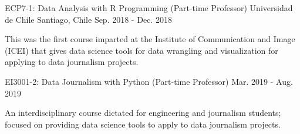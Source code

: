 \begin{cventries}
  \cventrytwopositions
    {ECP7-1: Data Analysis with R Programming (Part-time Professor)}
    {Universidad de Chile}
    {Santiago, Chile}
    {Sep. 2018 - Dec. 2018}
    {
      \begin{cvitems}
        \item {This was the first course imparted at the Institute of Communication and Image (ICEI) that gives data science tools for data wrangling and visualization for applying to data journalism projects.}      
      \end{cvitems}
    }
    {EI3001-2: Data Journalism with Python (Part-time Professor)}
    {Mar. 2019 - Aug. 2019}
    {
      \begin{cvitems}
        \item {An interdisciplinary course dictated for engineering and journalism students; focused on providing data science tools to apply to data journalism projects.}
      \end{cvitems}
    }



\end{cventries}
